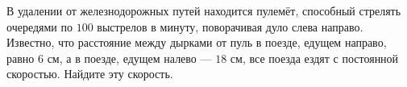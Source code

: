 В удалении от железнодорожных путей находится пулемёт, способный стрелять очередями по $100$ выстрелов в минуту, поворачивая дуло слева направо. Известно, что расстояние между дырками от пуль в поезде, едущем направо, равно $6$ см, а в поезде, едущем налево --- $18$ см, все поезда ездят с постоянной скоростью. Найдите эту скорость.